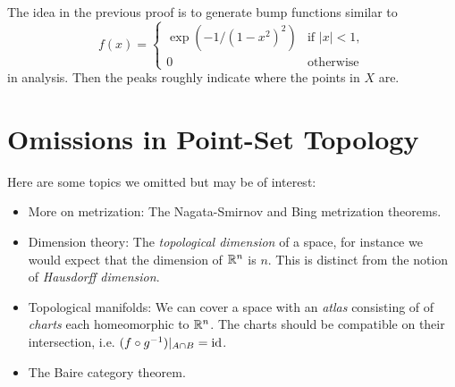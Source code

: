 \begin{remark}
  The idea in the previous proof is to generate
  bump functions similar to
  \[
    f(x) =
    \begin{cases}
      \exp(-1 / (1 - x^2)^2) & \text{if } |x| < 1, \\
      0 & \text{otherwise}
    \end{cases}
  \]
  in analysis. Then the peaks roughly indicate where
  the points in $X$ are.
\end{remark}

\section{Omissions in Point-Set Topology}
Here are some topics we omitted but may be of
interest:
\begin{itemize}
  \item More on metrization:
    The Nagata-Smirnov and Bing metrization theorems.
  \item Dimension theory: The \emph{topological dimension}
    of a space, for instance we would expect that
    the dimension of $\mathbb{R}^n$ is $n$. This is distinct
    from the notion of \emph{Hausdorff dimension}.
  \item Topological manifolds: We can cover
    a space with an \emph{atlas} consisting
    of of \emph{charts}
    each homeomorphic to $\mathbb{R}^n$. The charts should
    be compatible on their intersection, i.e.
    $(f \circ g^{-1})|_{A \cap B} = \operatorname{id}$.
  \item The Baire category theorem.
\end{itemize}

